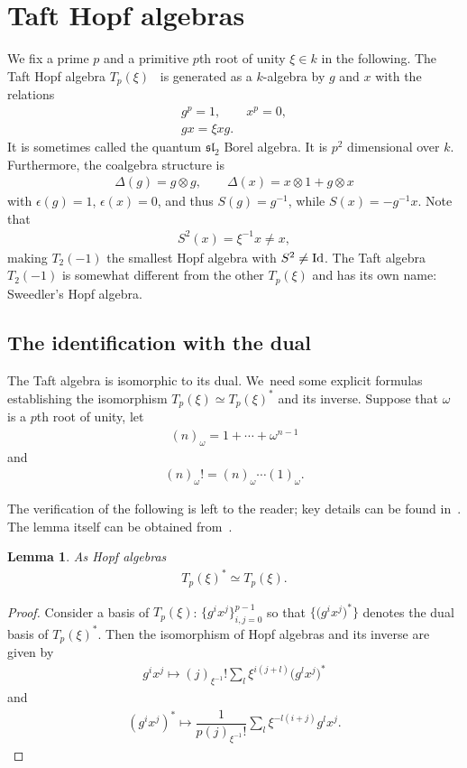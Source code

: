 \documentclass[pdftex]{sigma}
\numberwithin{equation}{section}
\newtheorem{Lemma}[Theorem]{Lemma}
\newcommand{\ot}{\otimes}
\begin{document}
\section{Taft Hopf algebras}\label{sec:blah}
We fix a prime $p$ and a primitive $p$th root of unity $\xi\in k$ in the following. The Taft Hopf algebra $T_p(\xi)$~\cite{taft} is generated as a $k$-algebra by $g$ and $x$ with the relations \begin{gather}
g^p=1,\qquad
x^p=0,
\\
gx=\xi xg.
\end{gather}
It is sometimes called the quantum ${\mathfrak{sl}}_2$ Borel algebra. It is $p^2$ dimensional over $k$. Furthermore, the coalgebra structure is
\begin{gather}
\Delta(g)=g\ot g,\qquad \Delta(x)=x\ot 1+g\ot x
\end{gather}
with $\epsilon(g)=1$, $\epsilon(x)=0$, and thus $S(g)=g^{-1}$, while $S(x)=-g^{-1}x$. Note that
\begin{gather}
S^2(x)=\xi^{-1}x\neq x,
\end{gather}
making $T_2(-1)$ the smallest Hopf algebra with $S^2\neq {\rm Id}$. The Taft algebra $T_2(-1)$ is somewhat different from the other $T_p(\xi)$ and has its own name: Sweedler’s Hopf algebra.

\subsection{The identification with the dual}
The Taft algebra is isomorphic to its dual. We~need some explicit formulas establishing the isomorphism $T_p(\xi)\simeq T_p(\xi)^*$ and its inverse. Suppose that $\omega$ is a $p$th root of unity, let
\begin{gather}
(n)_\omega=1+\cdots +\omega^{n-1}
\end{gather}
and
\begin{gather}
(n)_\omega !=(n)_\omega\cdots(1)_\omega.
\end{gather}

The verification of the following is left to the reader; key details can be found in~\cite{selfdual}. The lemma itself can be obtained from~\cite{nen}.
\begin{Lemma}\label{nenlem}
 As Hopf algebras
 \begin{gather}
 T_p(\xi)^*\simeq T_p(\xi).
 \end{gather}
\end{Lemma}
\begin{proof}
Consider a basis of $T_p(\xi)$: $\big\{g^ix^j\big\}_{ i,j=0}^{p-1}$ so that $\big\{\big(g^ix^j\big)^*\big\}$ denotes the dual basis of $T_p(\xi)^*$. Then the isomorphism of Hopf algebras and its inverse are given by
\begin{gather}
g^ix^j\mapsto(j)_{\xi^{-1}}!\sum_l\xi^{i(j+l)}\big(g^lx^j\big)^*
\end{gather}
and
\begin{gather}
(g^ix^j)^*\mapsto\dfrac{1}{p(j)_{\xi^{-1}}!}\sum_l\xi^{-l(i+j)}g^lx^j.
\end{gather}
\end{proof}
\end{document}
